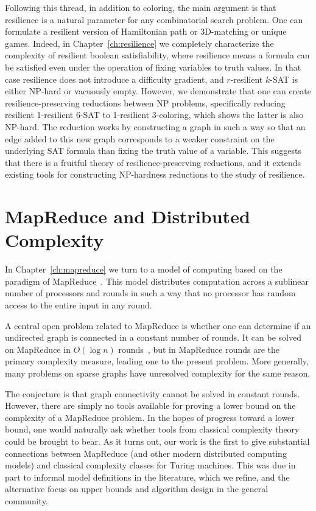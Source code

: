 Following this thread, in addition to coloring, the main argument is that
resilience is a natural parameter for any combinatorial search problem. One can
formulate a resilient version of Hamiltonian path or 3D-matching or unique
games. Indeed, in Chapter~\ref{ch:resilience} we completely characterize the
complexity of resilient boolean satisfiability, where resilience means a
formula can be satisfied even under the operation of fixing variables to truth
values. In that case resilience does not introduce a difficulty gradient, and
$r$-resilient $k$-SAT is either NP-hard or vacuously empty. However, we
demonstrate that one can create resilience-preserving reductions between NP
problems, specifically reducing resilient 1-resilient 6-SAT to 1-resilient
3-coloring, which shows the latter is also NP-hard. The reduction works by
constructing a graph in such a way so that an edge added to this new graph
corresponds to a weaker constraint on the underlying SAT formula than fixing
the truth value of a variable. This suggests that there is a fruitful theory of
resilience-preserving reductions, and it extends existing tools for
constructing NP-hardness reductions to the study of resilience.

\section{MapReduce and Distributed Complexity}

In Chapter~\ref{ch:mapreduce} we turn to a model of computing based on the
paradigm of MapReduce~\cite{DeanG08}. This model distributes computation
across a sublinear number of processors and rounds in such a way that no
processor has random access to the entire input in any round. 

A central open problem related to MapReduce is whether one can determine if an
undirected graph is connected in a constant number of rounds. It can be solved
on MapReduce in $O(\log n)$ rounds~\cite{Karloff10}, but in MapReduce rounds
are the primary complexity measure, leading one to the present problem.  More
generally, many problems on sparse graphs have unresolved complexity for the
same reason.

The conjecture is that graph connectivity cannot be solved in constant rounds.
However, there are simply no tools available for proving a lower bound on the
complexity of a MapReduce problem. In the hopes of progress toward a lower
bound, one would naturally ask whether tools from classical complexity theory
could be brought to bear. As it turns out, our work is the first to give
substantial connections between MapReduce (and other modern distributed
computing models) and classical complexity classes for Turing machines. This
was due in part to informal model definitions in the literature, which we
refine, and the alternative focus on upper bounds and algorithm design in the
general community.
 
